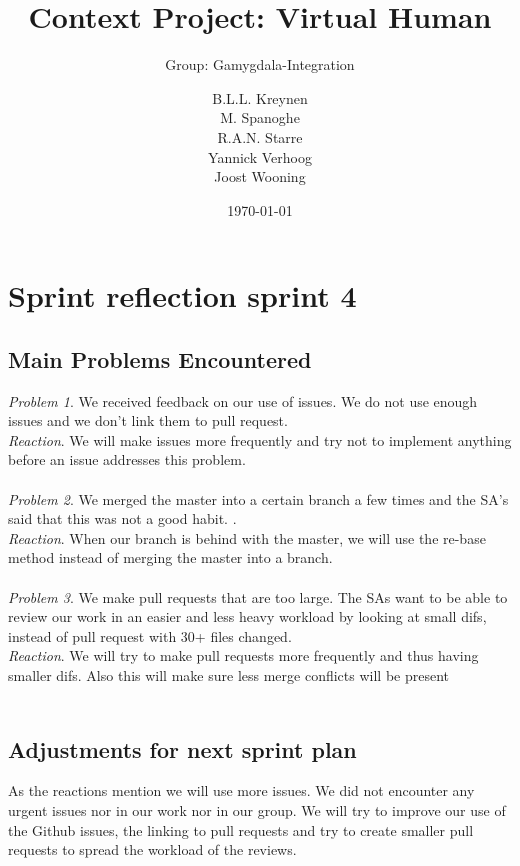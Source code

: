 \documentclass{scrartcl}
\begin{document}
\title{Context Project: Virtual Human}
\subtitle{Group: Gamygdala-Integration}
\date{\today{}}

\author{
    \begin{tabular}{l r}
      B.L.L. Kreynen\\
      M. Spanoghe\\
      R.A.N. Starre\\
      Yannick Verhoog\\
      Joost Wooning\\
    \end{tabular}
}

\maketitle \thispagestyle{empty} \pagebreak

\section{Sprint reflection sprint 4}

\subsection{Main Problems Encountered}

\emph{Problem 1}. We received feedback on our use of issues. We do not use enough issues and we don't link them to pull request.\\
\emph{Reaction}. We will make issues more frequently and try not to implement anything before an issue addresses this problem.\\
\\
\emph{Problem 2}. We merged the master into a certain branch a few times and the SA's said that this was not a good habit. .\\
\emph{Reaction}. When our branch is behind with the master, we will use the re-base method instead of merging the master into a branch.\\
\\
\emph{Problem 3}. We make pull requests that are too large. The SAs want to be able to review our work in an easier and less heavy workload by looking at small difs, instead of pull request with 30+ files changed.\\
\emph{Reaction}. We will try to make pull requests more frequently and thus having smaller difs. Also this will make sure less merge conflicts will be present\\
\\

\subsection{Adjustments for next sprint plan}
As the reactions mention we will use more issues. We did not encounter any urgent issues nor in our work nor in our group. We will try to improve our use of the Github issues, the linking to pull requests and try to create smaller pull requests to spread the workload of the reviews.
\end{document}
